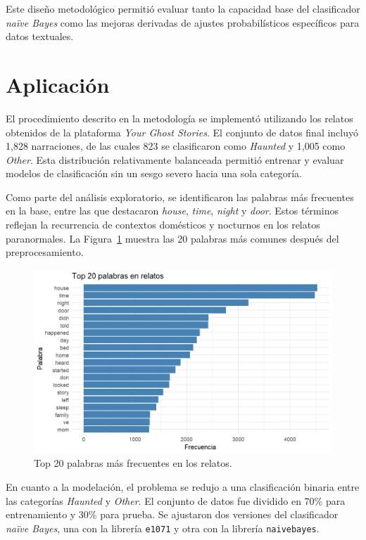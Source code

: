 \documentclass[eng]{ajceam-class}
\begin{document}
Este diseño metodológico permitió evaluar tanto la capacidad base del clasificador \textit{naïve Bayes} como las mejoras derivadas de ajustes probabilísticos específicos para datos textuales.  


\section{Aplicación}

El procedimiento descrito en la metodología se implementó utilizando los relatos obtenidos de la plataforma \textit{Your Ghost Stories}. El conjunto de datos final incluyó 1,828 narraciones, de las cuales 823 se clasificaron como \textit{Haunted} y 1,005 como \textit{Other}. Esta distribución relativamente balanceada permitió entrenar y evaluar modelos de clasificación sin un sesgo severo hacia una sola categoría.  

Como parte del análisis exploratorio, se identificaron las palabras más frecuentes en la base, entre las que destacaron \textit{house}, \textit{time}, \textit{night} y \textit{door}. Estos términos reflejan la recurrencia de contextos domésticos y nocturnos en los relatos paranormales. La Figura~\ref{fig:top20_app} muestra las 20 palabras más comunes después del preprocesamiento.  

\begin{figure}[H]
  \centering
  \includegraphics[width=0.85\columnwidth]{top20}
  \caption{Top 20 palabras más frecuentes en los relatos.}
  \label{fig:top20_app}
\end{figure}

En cuanto a la modelación, el problema se redujo a una clasificación binaria entre las categorías \textit{Haunted} y \textit{Other}. El conjunto de datos fue dividido en 70\% para entrenamiento y 30\% para prueba. Se ajustaron dos versiones del clasificador \textit{naïve Bayes}, una con la librería \texttt{e1071} y otra con la librería \texttt{naivebayes}.  
\end{document}

